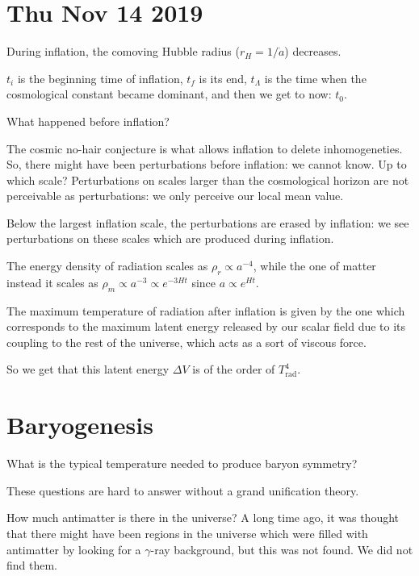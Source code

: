 \documentclass[main.tex]{subfiles}
\begin{document}
\section*{Thu Nov 14 2019}

During inflation, the comoving Hubble radius (\(r_H = 1/\dot{a}\)) decreases.

\(t_i\) is the beginning time of inflation, \(t_f\) is its end, \(t_\Lambda \) is the time when the cosmological constant became dominant, and then we get to now: \(t_0 \).

What happened before inflation?

The cosmic no-hair conjecture is what allows inflation to delete inhomogeneties.
So, there might have been perturbations before inflation: we cannot know.
Up to which scale? Perturbations on scales larger than the cosmological horizon are not perceivable as perturbations: we only perceive our local mean value.

Below the largest inflation scale, the perturbations are erased by inflation: we see perturbations on these scales which are produced during inflation.

The energy density of radiation scales as \(\rho _r \propto a^{-4}\), while the one of matter instead it scales as \(\rho _m \propto a^{-3} \propto e^{-3Ht}\) since \(a \propto e^{Ht}\).

The maximum temperature of radiation after inflation is given by the one which corresponds to the maximum latent energy released by our scalar field due to its coupling to the rest of the universe, which acts as a sort of viscous force.

So we get that this latent energy \(\Delta V\) is of the order of \(T^{4}_{\text{rad}}\).

\section{Baryogenesis}

What is the typical temperature needed to produce baryon symmetry? 


These questions are hard to answer without a grand unification theory.

How much antimatter is there in the universe?
A long time ago, it was thought that there might have been regions in the universe which were filled with antimatter by looking for a \(\gamma \)-ray background, but this was not found.
We did not find them.
\end{document}
